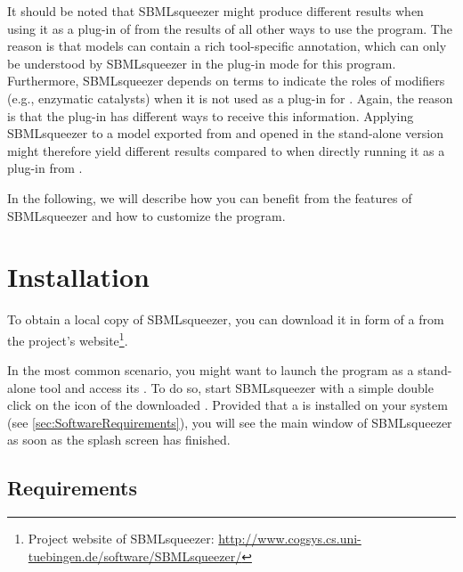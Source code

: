 It should be noted that SBMLsqueezer might produce different results when using it as a plug-in of \CellDesigner from the results of all other ways to use the program.
The reason is that \CellDesigner models can contain a rich tool-specific annotation, which can only be understood by SBMLsqueezer in the plug-in mode for this program.
Furthermore, SBMLsqueezer depends on \SBO terms to indicate the roles of modifiers (e.g., enzymatic catalysts) when it is not used as a plug-in for \CellDesigner.
Again, the reason is that the \CellDesigner plug-in has different ways to receive this information.
Applying SBMLsqueezer to a model exported from \CellDesigner and opened in the stand-alone version might therefore yield different results compared to when directly running it as a plug-in from \CellDesigner.

In the following, we will describe how you can benefit from the features of SBMLsqueezer
and how to customize the program.




\chapter{Installation}

To obtain a local copy of SBMLsqueezer, you can download it in form of a 
\JAR from the project's website\footnote{Project website of SBMLsqueezer: \url{http://www.cogsys.cs.uni-tuebingen.de/software/SBMLsqueezer/}}.

In the most common scenario, you might want to launch the program as a
stand-alone tool and access its \GUI. To do so,
start SBMLsqueezer with a simple double click on the icon of the downloaded
\JAR.
Provided that a \JVM is installed on your system 
(see \vref{sec:SoftwareRequirements}), you will see the main window of
SBMLsqueezer as soon as the splash screen has finished.

\section{Requirements}


